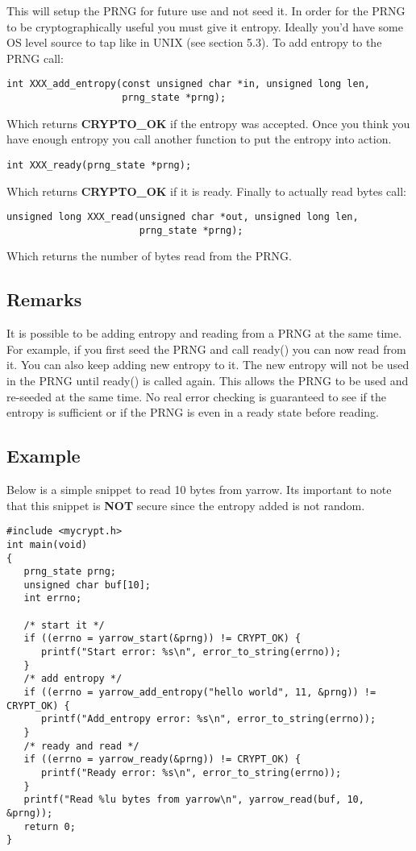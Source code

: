 \documentclass{book}
\begin{document}
This will setup the PRNG for future use and not seed it.  In order 
for the PRNG to be cryptographically useful you must give it entropy.  Ideally you'd have some OS level source to tap 
like in UNIX (see section 5.3).  To add entropy to the PRNG call:
\begin{verbatim}
int XXX_add_entropy(const unsigned char *in, unsigned long len, 
                    prng_state *prng);
\end{verbatim}

Which returns {\bf CRYPTO\_OK} if the entropy was accepted.  Once you think you have enough entropy you call another
function to put the entropy into action.
\begin{verbatim}
int XXX_ready(prng_state *prng);
\end{verbatim}

Which returns {\bf CRYPTO\_OK} if it is ready.  Finally to actually read bytes call:
\begin{verbatim}
unsigned long XXX_read(unsigned char *out, unsigned long len,
                       prng_state *prng);
\end{verbatim}

Which returns the number of bytes read from the PRNG.

\subsection{Remarks}

It is possible to be adding entropy and reading from a PRNG at the same time.  For example, if you first seed the PRNG
and call ready() you can now read from it.  You can also keep adding new entropy to it.  The new entropy will not be used
in the PRNG until ready() is called again.  This allows the PRNG to be used and re-seeded at the same time.  No real error 
checking is guaranteed to see if the entropy is sufficient or if the PRNG is even in a ready state before reading.

\subsection{Example}

Below is a simple snippet to read 10 bytes from yarrow.  Its important to note that this snippet is {\bf NOT} secure since
the entropy added is not random.

\begin{verbatim}
#include <mycrypt.h>
int main(void)
{
   prng_state prng;
   unsigned char buf[10];
   int errno;
   
   /* start it */
   if ((errno = yarrow_start(&prng)) != CRYPT_OK) {
      printf("Start error: %s\n", error_to_string(errno));
   }
   /* add entropy */
   if ((errno = yarrow_add_entropy("hello world", 11, &prng)) != CRYPT_OK) {
      printf("Add_entropy error: %s\n", error_to_string(errno));
   }
   /* ready and read */
   if ((errno = yarrow_ready(&prng)) != CRYPT_OK) {
      printf("Ready error: %s\n", error_to_string(errno));
   }
   printf("Read %lu bytes from yarrow\n", yarrow_read(buf, 10, &prng));
   return 0;
}
\end{verbatim}
\end{document}
